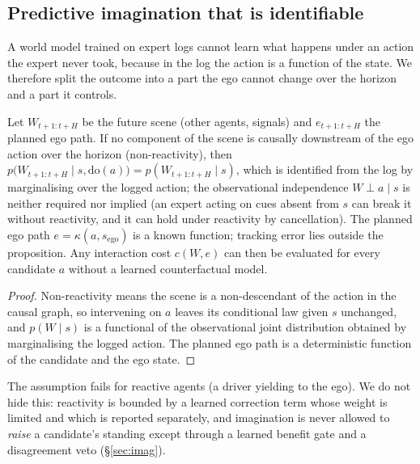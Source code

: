 \subsection{Predictive imagination that is identifiable}
A world model trained on expert logs cannot learn what happens under an action the expert never took,
because in the log the action is a function of the state. We therefore split the outcome into a part the ego cannot
change over the horizon and a part it controls.
\begin{proposition}\label{prop:ident}
Let $W_{t+1:t+H}$ be the future scene (other agents, signals) and $e_{t+1:t+H}$ the planned ego path. If no component of the scene is causally downstream of the ego action over the horizon (non-reactivity), then $p\big(W_{t+1:t+H}\mid s,\mathrm{do}(a)\big)=p(W_{t+1:t+H}\mid s)$, which is identified from the log by marginalising over the logged action; the observational independence $W\perp a\mid s$ is neither required nor implied (an expert acting on cues absent from $s$ can break it without reactivity, and it can hold under reactivity by cancellation). The planned ego path $e=\kappa(a,s_{\text{ego}})$ is a known function; tracking error lies outside the proposition. Any interaction cost $c(W,e)$ can then be evaluated for every candidate $a$ without a learned counterfactual model.
\end{proposition}
\begin{proof}
Non-reactivity means the scene is a non-descendant of the action in the causal graph, so intervening on $a$ leaves its conditional law given $s$ unchanged, and $p(W\mid s)$ is a functional of the observational joint distribution obtained by marginalising the logged action. The planned ego path is a deterministic function of the candidate and the ego state.\qedhere
\end{proof}
\noindent The assumption fails for reactive agents (a driver yielding to the ego). We do not hide this: reactivity is
bounded by a learned correction term whose weight is limited and which is reported separately, and imagination is
never allowed to \emph{raise} a candidate's standing except through a learned benefit gate and a disagreement veto (\S\ref{sec:imag}).

